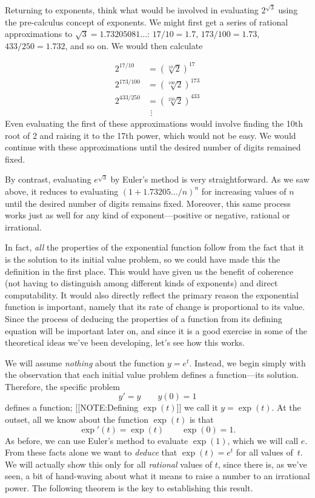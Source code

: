 Returning to exponents, think what would be involved in evaluating $2^{\sqrt{3}}$ using the pre-calculus concept of exponents.  We might first get a series of rational approximations to $\sqrt{3}=1.73205081\ldots$: $17/10=1.7$, $173/100=1.73$, $433/250=1.732$, and so on.  We would then calculate 



\mbox{}



\begin{align*}
2^{17/10}&=(\sqrt[10]{2})^{17} \\
2^{173/100}&=(\sqrt[100]{2})^{173} \\
2^{433/250}&=(\sqrt[250]{2})^{433} \\
           &\ \, \vdots
\end{align*}
Even evaluating the first of these approximations would involve
finding the 10th root of 2 and raising it to the 17th power, which
would not be easy.  We would continue with these approximations until
the desired number of digits remained fixed.

By contrast, evaluating $e^{\sqrt{3}}$ by Euler's method is very
straightforward.  As we saw above, it reduces to evaluating
$(1+1.73205\ldots/n)^n$ for increasing values of $n$ until the desired
number of digits remains fixed.  Moreover, this same process works
just as well for any kind of exponent---positive or negative, rational
or irrational.

In fact, {\em all} the properties of the exponential function follow
from the fact that it is the solution to its initial value problem, so
we could have made this the definition in the first place.  This would
have given us the benefit of coherence (not having to distinguish
among different kinds of exponents) and direct computability.  It
would also directly reflect the primary reason the exponential
function is important, namely that its rate of change is proportional
to its value.  Since the process of deducing the properties of a
function from its defining equation will be important later on, and
since it is a good exercise in some of the theoretical ideas we've
been developing, let's see how this works.

We will assume {\em nothing\/} about the function $y = e^t$.  Instead,
we begin simply with the observation that each initial value problem
defines a function---its solution.  Therefore, the specific problem
	\[
y' = y \qquad y(0) = 1
\]
defines a function;\index{$\exp$} 
	[[NOTE:Defining $\exp(t)$]]
we call it $y = \exp(t)$.  At the outset, all we know about the function $\exp(t)$ is that
	\[
\exp'(t) = \exp(t) \qquad \exp(0) = 1.
\]
As before, we can use Euler's method to evaluate $\exp(1)$, which we
will call $e$.  From these facts alone we want to {\em deduce\/} that
$\exp(t)=e^t$ for all values of~$t$.  We will actually show this only
for all {\em rational} values of $t$, since there is, as we've seen, a
bit of hand-waving about what it means to raise a number to an
irrational power. The following theorem is the key to establishing
this result.






